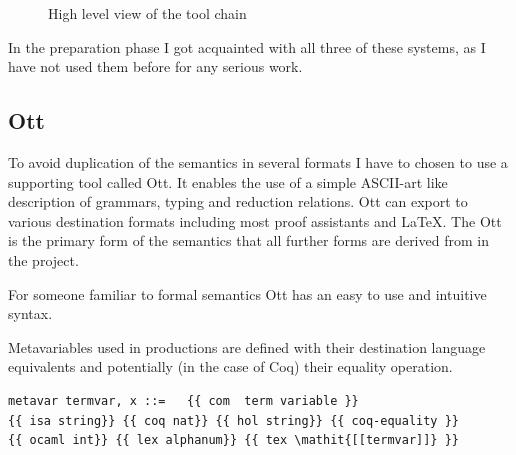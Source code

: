 \documentclass[12pt,twoside,notitlepage]{report}
\begin{document}
\begin{figure}[h!]
\centering

\caption{High level view of the tool chain}
\end{figure}


In the preparation phase I got acquainted with all three of these systems, as I have not used them before for any serious work.
\subsection{Ott}
To avoid duplication of the semantics in several formats I have to chosen to use a supporting tool called Ott. It enables the use of a simple ASCII-art like description of grammars, typing and reduction relations. Ott can export to various destination formats including most proof assistants and \LaTeX. The Ott  is the primary form of the semantics that all further forms are derived from in the project.

For someone familiar to formal semantics Ott has an easy to use and intuitive syntax. 

Metavariables used in productions are defined with their destination language equivalents and potentially (in the case of Coq) their equality operation.

\begin{lstlisting}[language={Ott}, caption={Ott metavariable definition}]
metavar termvar, x ::=   {{ com  term variable }} 
{{ isa string}} {{ coq nat}} {{ hol string}} {{ coq-equality }}
{{ ocaml int}} {{ lex alphanum}} {{ tex \mathit{[[termvar]]} }}
\end{lstlisting}
\end{document}

